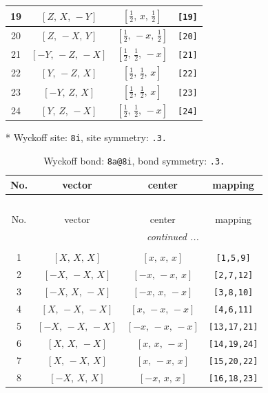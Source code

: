 \documentclass[fleqn,8pt]{jsarticle}
\begin{document}
\begin{longtable}{cccc}
19 & $\left[ Z,\, X,\, - Y \right]$ & $\left[ \frac{1}{2},\, x,\, \frac{1}{2} \right]$ & {\tt [19]} \\ \hline
20 & $\left[ Z,\, - X,\, Y \right]$ & $\left[ \frac{1}{2},\, - x,\, \frac{1}{2} \right]$ & {\tt [20]} \\ \hline
21 & $\left[ - Y,\, - Z,\, - X \right]$ & $\left[ \frac{1}{2},\, \frac{1}{2},\, - x \right]$ & {\tt [21]} \\ \hline
22 & $\left[ Y,\, - Z,\, X \right]$ & $\left[ \frac{1}{2},\, \frac{1}{2},\, x \right]$ & {\tt [22]} \\ \hline
23 & $\left[ - Y,\, Z,\, X \right]$ & $\left[ \frac{1}{2},\, \frac{1}{2},\, x \right]$ & {\tt [23]} \\ \hline
24 & $\left[ Y,\, Z,\, - X \right]$ & $\left[ \frac{1}{2},\, \frac{1}{2},\, - x \right]$ & {\tt [24]} \\
\end{longtable}
* Wyckoff site: {\tt 8i}, site symmetry: {\tt .3.}
\renewcommand{\arraystretch}{1.2}
\begin{longtable}{cccc}
\caption{Wyckoff bond: {\tt 8a@8i}, bond symmetry: {\tt .3.}}
 \\
 \hline \hline
No. & vector & center & mapping \\ \hline \endfirsthead

\multicolumn{3}{l}{\tablename\ \thetable{}} \\
 \hline \hline
No. & vector & center & mapping \\ \hline \endhead

 \hline \hline
\multicolumn{3}{r}{\footnotesize\it continued ...} \\ \endfoot

 \hline \hline
\multicolumn{3}{r}{} \\ \endlastfoot

1 & $\left[ X,\, X,\, X \right]$ & $\left[ x,\, x,\, x \right]$ & {\tt [1,5,9]} \\ \hline
2 & $\left[ - X,\, - X,\, X \right]$ & $\left[ - x,\, - x,\, x \right]$ & {\tt [2,7,12]} \\ \hline
3 & $\left[ - X,\, X,\, - X \right]$ & $\left[ - x,\, x,\, - x \right]$ & {\tt [3,8,10]} \\ \hline
4 & $\left[ X,\, - X,\, - X \right]$ & $\left[ x,\, - x,\, - x \right]$ & {\tt [4,6,11]} \\ \hline
5 & $\left[ - X,\, - X,\, - X \right]$ & $\left[ - x,\, - x,\, - x \right]$ & {\tt [13,17,21]} \\ \hline
6 & $\left[ X,\, X,\, - X \right]$ & $\left[ x,\, x,\, - x \right]$ & {\tt [14,19,24]} \\ \hline
7 & $\left[ X,\, - X,\, X \right]$ & $\left[ x,\, - x,\, x \right]$ & {\tt [15,20,22]} \\ \hline
8 & $\left[ - X,\, X,\, X \right]$ & $\left[ - x,\, x,\, x \right]$ & {\tt [16,18,23]} \\
\end{longtable}
\end{document}
